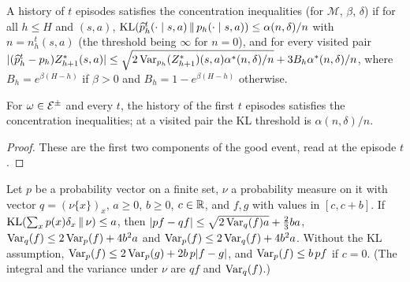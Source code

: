 \begin{definition}\label{def:pos_hist_concentration}
\leanok
{}
A history of $t$ episodes satisfies the concentration inequalities (for $\mathcal M$, $\beta$, $\delta$)
if for all $h \le H$ and $(s, a)$, $\mathrm{KL}(\widehat{p}_h^t(\cdot \mid s, a) \,\|\, p_h(\cdot \mid s, a)) \le \alpha(n, \delta)/n$
with $n = n_h^t(s, a)$ (the threshold being $\infty$ for $n = 0$), and for every visited pair
$\lvert (\widehat{p}_h^t - p_h)Z^*_{h+1}(s, a) \rvert \le \sqrt{2\operatorname{Var}_{p_h}(Z^*_{h+1})(s, a)\alpha^*(n, \delta)/n} + 3B_h\alpha^*(n, \delta)/n$,
where $B_h = e^{\beta(H - h)}$ if $\beta > 0$ and $B_h = 1 - e^{\beta(H - h)}$ otherwise.
\end{definition}

\begin{lemma}\label{lem:pos_hist_concentration}
\leanok
{}
For $\omega \in \mathcal{E}^\pm$ and every $t$, the history of the first $t$ episodes satisfies the
concentration inequalities; at a visited pair the KL threshold is $\alpha(n, \delta)/n$.
\end{lemma}

\begin{proof}
\leanok
These are the first two components of the good event, read at the episode $t$.
\end{proof}

\begin{lemma}\label{lem:pos_vec_kl}
\leanok
{}
Let $p$ be a probability vector on a finite set, $\nu$ a probability measure on it with vector
$q = (\nu\{x\})_x$, $a \ge 0$, $b \ge 0$, $c \in \mathbb{R}$, and $f, g$ with values in $[c, c + b]$. If
$\mathrm{KL}(\sum_x p(x)\delta_x \,\|\, \nu) \le a$, then
$\lvert pf - qf \rvert \le \sqrt{2\operatorname{Var}_q(f)a} + \frac23 ba$, $\operatorname{Var}_q(f) \le 2\operatorname{Var}_p(f) + 4b^2a$ and
$\operatorname{Var}_p(f) \le 2\operatorname{Var}_q(f) + 4b^2a$. Without the KL assumption,
$\operatorname{Var}_p(f) \le 2\operatorname{Var}_p(g) + 2b\,p\lvert f - g \rvert$, and $\operatorname{Var}_p(f) \le b\,pf$ if $c = 0$. (The integral and
the variance under $\nu$ are $qf$ and $\operatorname{Var}_q(f)$.)
\end{lemma}

